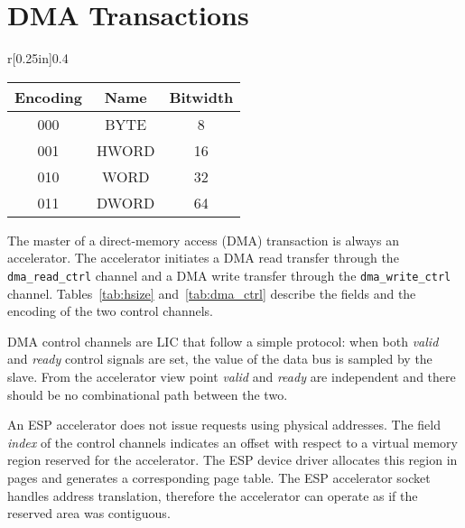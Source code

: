 
\section{DMA Transactions}

\begin{wraptable}{r}[0.25in]{0.4\textwidth}
\centering
\small
\caption{Encoding of DMA size}\label{tab:hsize}
\begin{tabular}{|c|c|c|}
\hline
  \textbf{Encoding} & \textbf{Name} & \textbf{Bitwidth} \\
\hline
  000  & BYTE & 8 \\
\hline
  001  & HWORD & 16 \\
\hline
  010  & WORD & 32 \\
\hline
  011  & DWORD & 64 \\
\hline
\end{tabular}
\end{wraptable}
{
The master of a direct-memory access (DMA) transaction is always an
accelerator. The accelerator initiates a DMA read transfer through the
\texttt{dma\_read\_ctrl} channel and a DMA write transfer through the
\texttt{dma\_write\_ctrl} channel. Tables~\ref{tab:hsize} and~\ref{tab:dma_ctrl} describe
the fields and the encoding of the two control channels.

DMA control channels are LIC that follow a simple protocol: when both {\it
  valid} and {\it ready} control signals are set, the value of the data bus is
sampled by the slave. From the accelerator view point {\it valid} and {\it
  ready} are independent and there should be no combinational path between the
two.

An ESP accelerator does not issue requests using physical addresses. The field
{\it index} of the control channels indicates an offset with respect to a
virtual memory region reserved for the accelerator. The ESP device driver
allocates this region in pages and generates a corresponding page table. The ESP
accelerator socket handles address translation, therefore the accelerator can
operate as if the reserved area was contiguous.
}


